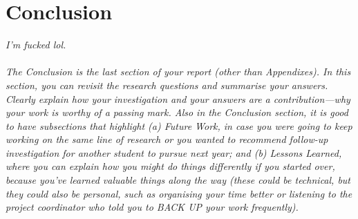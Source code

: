 \section{Conclusion}

\emph{
I'm fucked lol. \\ \\ 
The Conclusion is the last section of your report (other than Appendixes). In this section, you can revisit the research questions and summarise your answers. Clearly explain how your investigation and your answers are a contribution---why your work is worthy of a passing mark. Also in the Conclusion section, it is good to have subsections that highlight (a) Future Work, in case you were going to keep working on the same line of research or you wanted to recommend follow-up investigation for another student to pursue next year; and (b) Lessons Learned, where you can explain how you might do things differently if you started over, because you've learned valuable things along the way (these could be technical, but they could also be personal, such as organising your time better or listening to the project coordinator who told you to BACK UP your work frequently).}
